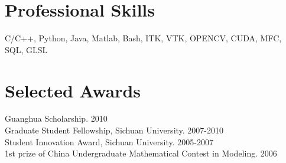 \documentclass[line,margin]{res}
\begin{document}
\begin{resume}
\section{\sc Professional Skills}
\smallskip

C/C++, Python, Java, Matlab, Bash, ITK, VTK, OPENCV, CUDA, MFC, SQL, GLSL
 
\section{\sc Selected Awards}


Guanghua Scholarship.  \hfill       2010\\
Graduate Student Fellowship, Sichuan University.  \hfill       2007-2010\\
Student Innovation Award, Sichuan University.  \hfill        2005-2007 \\%
1st prize of China Undergraduate Mathematical Contest in Modeling.  \hfill       2006



\end{resume}

%
%
\end{document}
